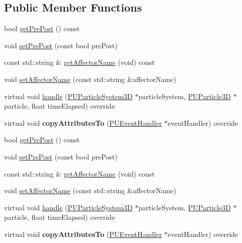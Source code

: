 \subsection*{Public Member Functions}
\begin{DoxyCompactItemize}
\item 
bool \hyperlink{classPUDoAffectorEventHandler_a1756bb1ab67047f7c79197554113c846}{get\+Pre\+Post} () const
\item 
void \hyperlink{classPUDoAffectorEventHandler_ab0496c908b49a28cc80113a96b512f4e}{set\+Pre\+Post} (const bool pre\+Post)
\item 
const std\+::string \& \hyperlink{classPUDoAffectorEventHandler_abdbe8db707a838ed5dd3a59d1cb0e508}{get\+Affector\+Name} (void) const
\item 
void \hyperlink{classPUDoAffectorEventHandler_af784f76a5eaf5b3d073a0d0ee168ec89}{set\+Affector\+Name} (const std\+::string \&affector\+Name)
\item 
virtual void \hyperlink{classPUDoAffectorEventHandler_a5eb0b94268f5f65462590649b53b50e6}{handle} (\hyperlink{classPUParticleSystem3D}{P\+U\+Particle\+System3D} $\ast$particle\+System, \hyperlink{structPUParticle3D}{P\+U\+Particle3D} $\ast$particle, float time\+Elapsed) override
\item 
\mbox{\label{classPUDoAffectorEventHandler_a7be0fdfb8971aac19e6aafa0a1b7c889}} 
virtual void {\bfseries copy\+Attributes\+To} (\hyperlink{classPUEventHandler}{P\+U\+Event\+Handler} $\ast$event\+Handler) override
\item 
bool \hyperlink{classPUDoAffectorEventHandler_a1756bb1ab67047f7c79197554113c846}{get\+Pre\+Post} () const
\item 
void \hyperlink{classPUDoAffectorEventHandler_ab0496c908b49a28cc80113a96b512f4e}{set\+Pre\+Post} (const bool pre\+Post)
\item 
const std\+::string \& \hyperlink{classPUDoAffectorEventHandler_abdbe8db707a838ed5dd3a59d1cb0e508}{get\+Affector\+Name} (void) const
\item 
void \hyperlink{classPUDoAffectorEventHandler_af784f76a5eaf5b3d073a0d0ee168ec89}{set\+Affector\+Name} (const std\+::string \&affector\+Name)
\item 
virtual void \hyperlink{classPUDoAffectorEventHandler_a73dcf140c4011202233774858c1b6e02}{handle} (\hyperlink{classPUParticleSystem3D}{P\+U\+Particle\+System3D} $\ast$particle\+System, \hyperlink{structPUParticle3D}{P\+U\+Particle3D} $\ast$particle, float time\+Elapsed) override
\item 
\mbox{\label{classPUDoAffectorEventHandler_a41ccc5fa98d3821f40099d6e0b23a1b6}} 
virtual void {\bfseries copy\+Attributes\+To} (\hyperlink{classPUEventHandler}{P\+U\+Event\+Handler} $\ast$event\+Handler) override
\end{DoxyCompactItemize}
